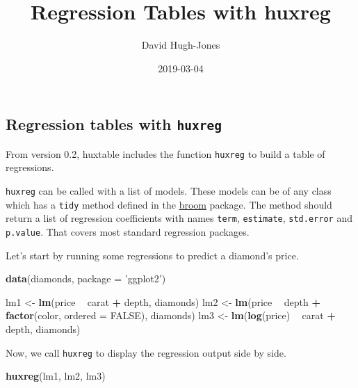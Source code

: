 \documentclass[]{article}
\title{Regression Tables with huxreg}
\author{David Hugh-Jones}
\date{2019-03-04}
\newenvironment{Shaded}{\begin{snugshade}}{\end{snugshade}}
\newcommand{\DataTypeTok}[1]{\textcolor[rgb]{0.13,0.29,0.53}{#1}}
\newcommand{\KeywordTok}[1]{\textcolor[rgb]{0.13,0.29,0.53}{\textbf{#1}}}
\newcommand{\NormalTok}[1]{#1}
\newcommand{\OperatorTok}[1]{\textcolor[rgb]{0.81,0.36,0.00}{\textbf{#1}}}
\newcommand{\OtherTok}[1]{\textcolor[rgb]{0.56,0.35,0.01}{#1}}
\newcommand{\StringTok}[1]{\textcolor[rgb]{0.31,0.60,0.02}{#1}}
\begin{document}
\maketitle

\hypertarget{regression-tables-with-huxreg}{%
\subsection{\texorpdfstring{Regression tables with
\texttt{huxreg}}{Regression tables with huxreg}}\label{regression-tables-with-huxreg}}

From version 0.2, huxtable includes the function \texttt{huxreg} to
build a table of regressions.

\texttt{huxreg} can be called with a list of models. These models can be
of any class which has a \texttt{tidy} method defined in the
\href{https://cran.r-project.org/?package=broom}{broom} package. The
method should return a list of regression coefficients with names
\texttt{term}, \texttt{estimate}, \texttt{std.error} and
\texttt{p.value}. That covers most standard regression packages.

Let's start by running some regressions to predict a diamond's price.

\begin{Shaded}
\begin{Highlighting}[]
\KeywordTok{data}\NormalTok{(diamonds, }\DataTypeTok{package =} \StringTok{'ggplot2'}\NormalTok{)}

\NormalTok{lm1 <-}\StringTok{ }\KeywordTok{lm}\NormalTok{(price }\OperatorTok{~}\StringTok{ }\NormalTok{carat }\OperatorTok{+}\StringTok{ }\NormalTok{depth, diamonds)}
\NormalTok{lm2 <-}\StringTok{ }\KeywordTok{lm}\NormalTok{(price }\OperatorTok{~}\StringTok{ }\NormalTok{depth }\OperatorTok{+}\StringTok{ }\KeywordTok{factor}\NormalTok{(color, }\DataTypeTok{ordered =} \OtherTok{FALSE}\NormalTok{), diamonds)}
\NormalTok{lm3 <-}\StringTok{ }\KeywordTok{lm}\NormalTok{(}\KeywordTok{log}\NormalTok{(price) }\OperatorTok{~}\StringTok{ }\NormalTok{carat }\OperatorTok{+}\StringTok{ }\NormalTok{depth, diamonds)}
\end{Highlighting}
\end{Shaded}

\FloatBarrier

Now, we call \texttt{huxreg} to display the regression output side by
side.

\begin{Shaded}
\begin{Highlighting}[]
\KeywordTok{huxreg}\NormalTok{(lm1, lm2, lm3)}
\end{Highlighting}
\end{Shaded}
\end{document}
